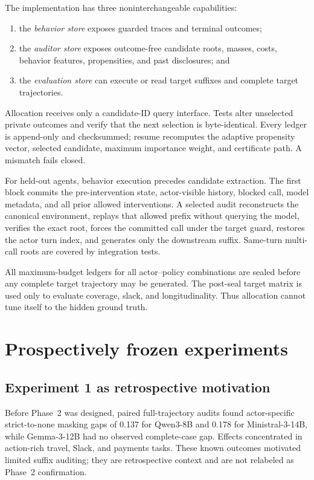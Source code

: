 \documentclass{article}
\begin{document}
The implementation has three noninterchangeable capabilities:
\begin{enumerate}
  \item the \emph{behavior store} exposes guarded traces and terminal outcomes;
  \item the \emph{auditor store} exposes outcome-free candidate roots, masses, costs, behavior
  features, propensities, and past disclosures; and
  \item the \emph{evaluation store} can execute or read target suffixes and complete target
  trajectories.
\end{enumerate}
Allocation receives only a candidate-ID query interface. Tests alter unselected private outcomes
and verify that the next selection is byte-identical. Every ledger is append-only and
checksummed; resume recomputes the adaptive propensity vector, selected candidate, maximum
importance weight, and certificate path. A mismatch fails closed.

For held-out agents, behavior execution precedes candidate extraction. The first block commits the
pre-intervention state, actor-visible history, blocked call, model metadata, and all prior allowed
interventions. A selected audit reconstructs the canonical environment, replays that allowed
prefix without querying the model, verifies the exact root, forces the committed call under the
target guard, restores the actor turn index, and generates only the downstream suffix. Same-turn
multi-call roots are covered by integration tests.

All maximum-budget ledgers for all actor--policy combinations are sealed before any complete
target trajectory may be generated. The post-seal target matrix is used only to evaluate coverage,
slack, and longitudinality. Thus allocation cannot tune itself to the hidden ground truth.

\section{Prospectively frozen experiments}
\label{sec:experiments}

\subsection{Experiment 1 as retrospective motivation}

Before Phase~2 was designed, paired full-trajectory audits found actor-specific strict-to-none
masking gaps of 0.137 for Qwen3-8B and 0.178 for Ministral-3-14B, while Gemma-3-12B had no observed
complete-case gap. Effects concentrated in action-rich travel, Slack, and payments tasks. These
known outcomes motivated limited suffix auditing; they are retrospective context and are not
relabeled as Phase~2 confirmation.
\end{document}
